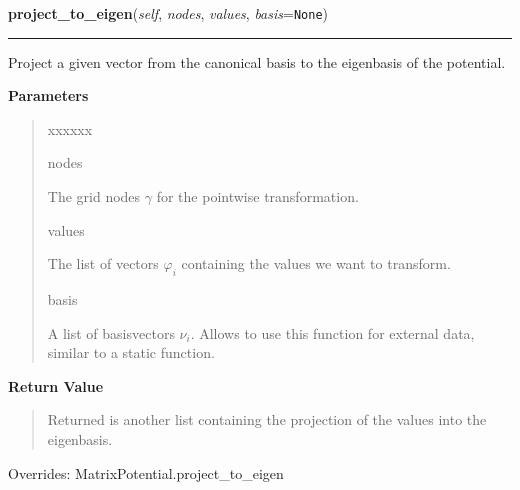    \vspace{0.5ex}

\hspace{.8\funcindent}\begin{boxedminipage}{\funcwidth}

    \raggedright \textbf{project\_to\_eigen}(\textit{self}, \textit{nodes}, \textit{values}, \textit{basis}={\tt None})

    \vspace{-1.5ex}

    \rule{\textwidth}{0.5\fboxrule}
\setlength{\parskip}{2ex}
    Project a given vector from the canonical basis to the eigenbasis of
    the potential.

\setlength{\parskip}{1ex}
      \textbf{Parameters}
      \vspace{-1ex}

      \begin{quote}
        \begin{Ventry}{xxxxxx}

          \item[nodes]

          The grid nodes $\gamma$ for the pointwise
          transformation.

          \item[values]

          The list of vectors $\varphi_i$ containing the
          values we want to transform.

          \item[basis]

          A list of basisvectors $\nu_i$. Allows to use this function for
          external data, similar to a static function.

        \end{Ventry}

      \end{quote}

      \textbf{Return Value}
    \vspace{-1ex}

      \begin{quote}
      Returned is another list containing the projection of the values into
      the eigenbasis.

      \end{quote}



      Overrides: MatrixPotential.project\_to\_eigen

    \end{boxedminipage}

